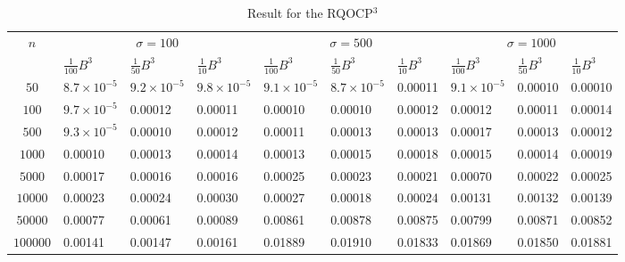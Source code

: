 \documentclass{article}
\theoremstyle{plain}
\begin{document}
\begin{table}[H]
\small
\centering
\caption{Result for the RQOCP$^3$}
\label{tab3}
\begin{tabular}{|c|lll|lll|lll|}
\hline
\multirow{2}{*}{$n$}  
  & \multicolumn{3}{c|}{$\sigma=100$} & \multicolumn{3}{c|}{$\sigma=500$} &\multicolumn{3}{c|}{$\sigma=1000$}\\
\cline{2-10}
 &  $\frac{1}{100}B^3$ & $\frac{1}{50} B^3$ & $\frac{1}{10}B^3$& $\frac{1}{100}B^3$ & $\frac{1}{50} B^3$ & $\frac{1}{10}B^3$& $\frac{1}{100}B^3$ & $\frac{1}{50} B^3$ & $\frac{1}{10}B^3$\\
\hline
$50$  & $8.7 \times 10^{-5}$ & $9.2 \times 10^{-5}$ & $9.8 \times 10^{-5}$& $9.1 \times 10^{-5}$ & $8.7 \times 10^{-5}$  & 0.00011& $9.1 \times 10^{-5}$ & 0.00010  & 0.00010  \\
\hline
$100$  & $9.7 \times 10^{-5}$  & 0.00012 & 0.00011 & 0.00010 & 0.00010 & 0.00012  & 0.00012& 0.00011 & 0.00014   \\
\hline
$500$ & $9.3 \times 10^{-5}$  & 0.00010 & 0.00012& 0.00011 & 0.00013  &0.00013 & 0.00017 & 0.00013  & 0.00012 \\
\hline
$1000$  & 0.00010   & 0.00013 & 0.00014 & 0.00013 & 0.00015 &  0.00018 & 0.00015& 0.00014 & 0.00019   \\
\hline
$5000$ & 0.00017 & 0.00016 & 0.00016 & 0.00025 & 0.00023  &0.00021 & 0.00070 & 0.00022  &0.00025  \\
\hline
$10000$  & 0.00023  & 0.00024 & 0.00030&  0.00027& 0.00018  &0.00024 & 0.00131 & 0.00132  &0.00139  \\
\hline
$50000$ & 0.00077 & 0.00061 & 0.00089& 0.00861 & 0.00878  & 0.00875 & 0.00799 & 0.00871  & 0.00852  \\
\hline
$100000$  & 0.00141 & 0.00147 & 0.00161& 0.01889 & 0.01910  & 0.01833 & 0.01869 & 0.01850  & 0.01881  \\
\hline
\end{tabular}
\end{table}
\end{document}

